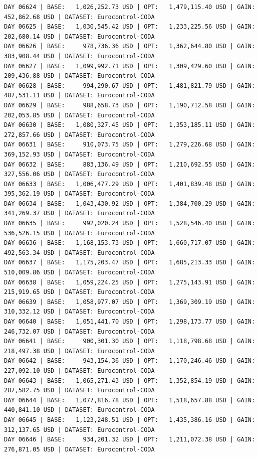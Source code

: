 \documentclass[11pt,a4paper]{article}
\begin{document}
\begin{verbatim}
DAY 06624 | BASE:   1,026,252.73 USD | OPT:   1,479,115.40 USD | GAIN: 452,862.68 USD | DATASET: Eurocontrol-CODA
DAY 06625 | BASE:   1,030,545.42 USD | OPT:   1,233,225.56 USD | GAIN: 202,680.14 USD | DATASET: Eurocontrol-CODA
DAY 06626 | BASE:     978,736.36 USD | OPT:   1,362,644.80 USD | GAIN: 383,908.44 USD | DATASET: Eurocontrol-CODA
DAY 06627 | BASE:   1,099,992.71 USD | OPT:   1,309,429.60 USD | GAIN: 209,436.88 USD | DATASET: Eurocontrol-CODA
DAY 06628 | BASE:     994,290.67 USD | OPT:   1,481,821.79 USD | GAIN: 487,531.11 USD | DATASET: Eurocontrol-CODA
DAY 06629 | BASE:     988,658.73 USD | OPT:   1,190,712.58 USD | GAIN: 202,053.85 USD | DATASET: Eurocontrol-CODA
DAY 06630 | BASE:   1,080,327.45 USD | OPT:   1,353,185.11 USD | GAIN: 272,857.66 USD | DATASET: Eurocontrol-CODA
DAY 06631 | BASE:     910,073.75 USD | OPT:   1,279,226.68 USD | GAIN: 369,152.93 USD | DATASET: Eurocontrol-CODA
DAY 06632 | BASE:     883,136.49 USD | OPT:   1,210,692.55 USD | GAIN: 327,556.06 USD | DATASET: Eurocontrol-CODA
DAY 06633 | BASE:   1,006,477.29 USD | OPT:   1,401,839.48 USD | GAIN: 395,362.19 USD | DATASET: Eurocontrol-CODA
DAY 06634 | BASE:   1,043,430.92 USD | OPT:   1,384,700.29 USD | GAIN: 341,269.37 USD | DATASET: Eurocontrol-CODA
DAY 06635 | BASE:     992,020.24 USD | OPT:   1,528,546.40 USD | GAIN: 536,526.15 USD | DATASET: Eurocontrol-CODA
DAY 06636 | BASE:   1,168,153.73 USD | OPT:   1,660,717.07 USD | GAIN: 492,563.34 USD | DATASET: Eurocontrol-CODA
DAY 06637 | BASE:   1,175,203.47 USD | OPT:   1,685,213.33 USD | GAIN: 510,009.86 USD | DATASET: Eurocontrol-CODA
DAY 06638 | BASE:   1,059,224.25 USD | OPT:   1,275,143.91 USD | GAIN: 215,919.65 USD | DATASET: Eurocontrol-CODA
DAY 06639 | BASE:   1,058,977.07 USD | OPT:   1,369,309.19 USD | GAIN: 310,332.12 USD | DATASET: Eurocontrol-CODA
DAY 06640 | BASE:   1,051,441.70 USD | OPT:   1,298,173.77 USD | GAIN: 246,732.07 USD | DATASET: Eurocontrol-CODA
DAY 06641 | BASE:     900,301.30 USD | OPT:   1,118,798.68 USD | GAIN: 218,497.38 USD | DATASET: Eurocontrol-CODA
DAY 06642 | BASE:     943,154.36 USD | OPT:   1,170,246.46 USD | GAIN: 227,092.10 USD | DATASET: Eurocontrol-CODA
DAY 06643 | BASE:   1,065,271.43 USD | OPT:   1,352,854.19 USD | GAIN: 287,582.75 USD | DATASET: Eurocontrol-CODA
DAY 06644 | BASE:   1,077,816.78 USD | OPT:   1,518,657.88 USD | GAIN: 440,841.10 USD | DATASET: Eurocontrol-CODA
DAY 06645 | BASE:   1,123,248.51 USD | OPT:   1,435,386.16 USD | GAIN: 312,137.65 USD | DATASET: Eurocontrol-CODA
DAY 06646 | BASE:     934,201.32 USD | OPT:   1,211,072.38 USD | GAIN: 276,871.05 USD | DATASET: Eurocontrol-CODA

\end{verbatim}
\end{document}
